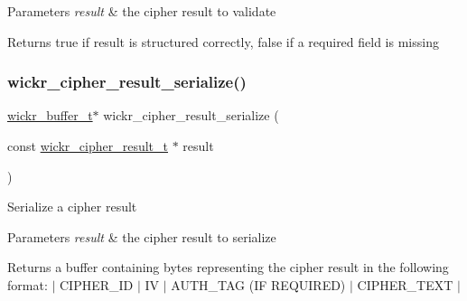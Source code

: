 \begin{DoxyParams}{Parameters}
{\em result} & the cipher result to validate \\
\hline
\end{DoxyParams}
\begin{DoxyReturn}{Returns}
true if result is structured correctly, false if a required field is missing 
\end{DoxyReturn}
\mbox{\label{group__wickr__cipher_gacda386115dc52f83a0518f8ac0dad6a2}} 
\subsubsection{\texorpdfstring{wickr\_cipher\_result\_serialize()}{wickr\_cipher\_result\_serialize()}}
{\footnotesize\ttfamily \mbox{\hyperlink{structwickr__buffer}{wickr\+\_\+buffer\+\_\+t}}$\ast$ wickr\+\_\+cipher\+\_\+result\+\_\+serialize (\begin{DoxyParamCaption}\item[{const \mbox{\hyperlink{structwickr__cipher__result}{wickr\+\_\+cipher\+\_\+result\+\_\+t}} $\ast$}]{result }\end{DoxyParamCaption})}

Serialize a cipher result


\begin{DoxyParams}{Parameters}
{\em result} & the cipher result to serialize \\
\hline
\end{DoxyParams}
\begin{DoxyReturn}{Returns}
a buffer containing bytes representing the cipher result in the following format\+: $\vert$ C\+I\+P\+H\+E\+R\+\_\+\+ID $\vert$ IV $\vert$ A\+U\+T\+H\+\_\+\+T\+AG (IF R\+E\+Q\+U\+I\+R\+ED) $\vert$ C\+I\+P\+H\+E\+R\+\_\+\+T\+E\+XT $\vert$ 
\end{DoxyReturn}
